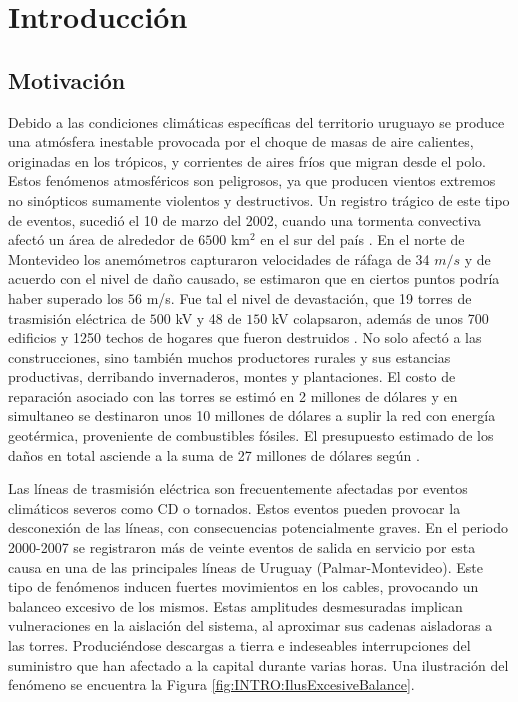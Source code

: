 \chapter{Introducción}\label{Cap:Introduccion}
 
\section{Motivación}
\linenumbers
Debido a las condiciones climáticas específicas del territorio uruguayo se produce una atmósfera inestable provocada por el choque de masas de aire calientes, originadas en los trópicos, y corrientes de aires fríos que migran desde el polo. Estos fenómenos atmosféricos son peligrosos, ya que producen vientos extremos no sinópticos sumamente violentos y destructivos. Un registro trágico de este tipo de eventos, sucedió el 10 de marzo del 2002, cuando una tormenta convectiva afectó un área de alrededor de $6500$ km$^2$ en el sur del país \cite{tormenta2002}. En el norte de Montevideo los anemómetros capturaron velocidades de ráfaga de 34 $m/s$ y de acuerdo con el nivel de daño causado, se estimaron que en ciertos puntos podría haber superado los $56$ m/s. Fue tal el nivel de devastación, que 19 torres de trasmisión eléctrica de $500$ kV y 48 de $150$ kV colapsaron, además de unos 700 edificios y 1250 techos de hogares que fueron destruidos \citep{duranona2015significance}. No solo afectó a las construcciones, sino también muchos productores rurales y sus estancias productivas, derribando invernaderos, montes y plantaciones. El costo de reparación asociado con las torres se estimó en 2 millones de dólares y en simultaneo se destinaron unos 10 millones de dólares a suplir la red con energía geotérmica, proveniente de combustibles fósiles. El presupuesto estimado de los daños en total asciende a la suma de 27 millones de dólares según \cite{duranona2019first}. 

Las líneas de trasmisión eléctrica son frecuentemente afectadas por eventos climáticos severos como \gls{CD} o tornados. Estos eventos pueden provocar la desconexión de las líneas, con consecuencias potencialmente graves. En el periodo 2000-2007 se registraron más de veinte eventos de salida en servicio por esta causa en una de las principales líneas de Uruguay (Palmar-Montevideo). Este tipo de fenómenos inducen fuertes movimientos en los cables, provocando un balanceo excesivo de los mismos. Estas amplitudes desmesuradas implican vulneraciones en la aislación del sistema, al aproximar sus cadenas aisladoras a las torres. Produciéndose descargas a tierra e indeseables interrupciones del suministro que han afectado a la capital durante varias horas. Una ilustración del fenómeno se encuentra la Figura \ref{fig:INTRO:IlusExcesiveBalance}. 

